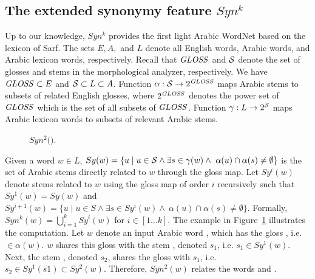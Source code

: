 
\subsection{The extended synonymy feature $Syn^k$}
\label{subsec:synk}

Up to our knowledge, 
$Syn^k$ provides the first light Arabic WordNet based on the lexicon of Sarf.
The sets $E, A,$ and $L$ denote all English words, Arabic words, 
and Arabic lexicon words, respectively.
Recall that $\GG$ and $\ss$ denote the set of glosses and stems in the morphological analyzer, respectively.
We have $\GG \subset E$ and $\ss \subset L \subset A$. 
Function $\alpha: \ss \rightarrow 2^{\GG}$ maps Arabic stems to 
subsets of related English glosses, %
where $2^{\GG}$ denotes the power set of $\GG$ which is the set of all subsets 
of $\GG$.
Function $\gamma: L \rightarrow 2^{\ss}$ maps Arabic lexicon words to subsets 
of relevant Arabic stems. %

\begin{figure}[tb]
\begin{center}
\vspace{-3em}
\caption{$Syn^2($$)$.}
\vspace{-2em}
\label{fig:introsynEx}
\end{center}
\end{figure}

Given a word $w\in L$, 
$Sy(w)=\{u\mid u\in \ss \land\exists s\in \gamma(w)\land~\alpha(u)\cap\alpha(s)\neq\emptyset\}$
is the set of Arabic stems 
directly related to $w$ through the gloss map.
%
Let $Sy^{i}(w)$ denote stems related to $w$ using the gloss map of order $i$ recursively such that
$Sy^{1}(w) = Sy(w)$ and
$Sy^{i+1}(w)=\{u\mid u\in S\land\exists s\in Sy^{i}(w)\land~\alpha(u)\cap\alpha(s)\neq\emptyset\}$.
Formally, $Syn^k(w) = \bigcup\limits_{i=1}^{k} Sy^{i}(w)$ for $i\in[1 \ldots k]$.
%
The example in Figure~\ref{fig:introsynEx} illustrates the computation.
Let $w$ denote an input Arabic word , which has the gloss , i.e.  $\in\alpha(w)$.
$w$ shares this gloss with the stem , denoted $s_1$, i.e. $s_1\in Sy^{1}(w)$.
Next, the stem , denoted $s_2$, shares the gloss  with $s_1$, i.e. $s_2\in Sy^{1}(s1)\subset Sy^{2}(w)$.
Therefore, $Syn^2(w)$ relates the words  and .

